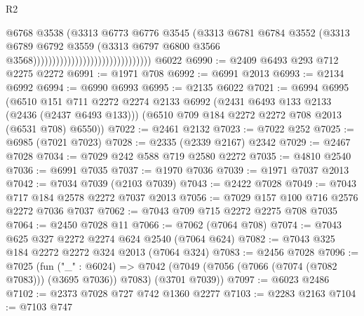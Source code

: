 \begin{lexlean}{R2}
\begin{coremodule}
                                                          @6768
                                                          @3538
                                                          (@3313
                                                            @6773
                                                            @6776
                                                            @3545
                                                            (@3313
                                                              @6781
                                                              @6784
                                                              @3552
                                                              (@3313
                                                                @6789
                                                                @6792
                                                                @3559
                                                                (@3313
                                                                  @6797
                                                                  @6800
                                                                  @3566
                                                                  @3568)))))))))))))))))))))))))))))))
    @6022
@6990 := @2409 @6493 @293 @712 @2275 @2272
@6991 := @1971 @708
@6992 := @6991 @2013
@6993 := @2134 @6992
@6994 := @6990 @6993
@6995 := @2135 @6022
@7021 := @6994
    @6995
    (@6510
      @151
      @711
      @2272
      @2274
      @2133
      @6992
      (@2431 @6493 @133 @2133 (@2436 (@2437 @6493 @133)))
      (@6510 @709 @184 @2272 @2272 @708 @2013 (@6531 @708) @6550))
@7022 := @2461 @2132
@7023 := @7022 @252
@7025 := @6985 (@7021 @7023)
@7028 := @2335 (@2339 @2167) @2342
@7029 := @2467 @7028
@7034 := @7029 @242 @588 @719 @2580 @2272
@7035 := @4810 @2540
@7036 := @6991 @7035
@7037 := @1970 @7036
@7039 := @1971 @7037 @2013
@7042 := @7034 @7039 (@2103 @7039)
@7043 := @2422 @7028
@7049 := @7043 @717 @184 @2578 @2272 @7037 @2013
@7056 := @7029 @157 @100 @716 @2576 @2272 @7036 @7037
@7062 := @7043 @709 @715 @2272 @2275 @708 @7035
@7064 := @2450 @7028 @11
@7066 := @7062 (@7064 @708)
@7074 := @7043 @625 @327 @2272 @2274 @624 @2540 (@7064 @624)
@7082 := @7043 @325 @184 @2272 @2272 @324 @2013 (@7064 @324)
@7083 := @2456 @7028
@7096 := @7025
    (fun ("_" : @6024) =>
    @7042 (@7049 (@7056 (@7066 (@7074 (@7082 @7083))) (@3695 @7036)) @7083) (@3701 @7039))
@7097 := @6023 @2486
@7102 := @2373 @7028 @727 @742 @1360 @2277
@7103 := @2283 @2163
@7104 := @7103 @747

\end{coremodule}
\end{lexlean}
